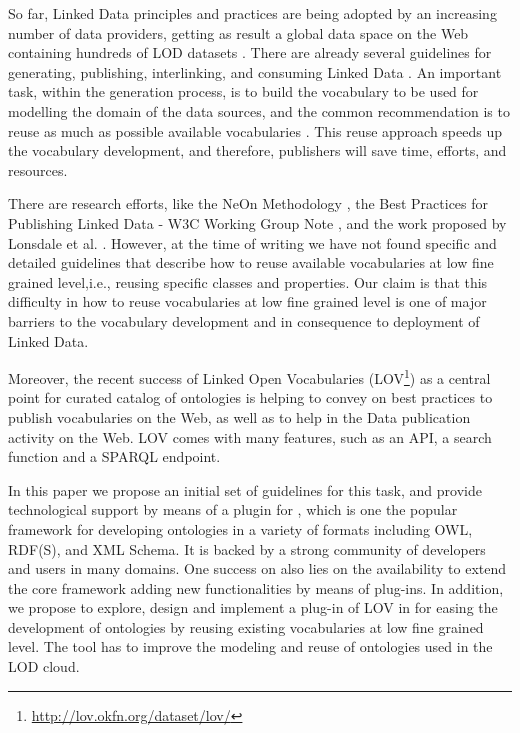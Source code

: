 So far, Linked Data principles and practices are being adopted by an increasing number of data providers, getting as result a global data space on the Web containing hundreds of LOD datasets \cite{Heath_Bizer_2011}. There are already several guidelines for generating, publishing, interlinking, and consuming Linked Data \cite{Heath_Bizer_2011}. An important task, within the generation process, is to build the vocabulary to be used for modelling the domain of the data sources, and the common recommendation is to reuse as much as possible available vocabularies \cite{Heath_Bizer_2011,hyland14}. This reuse approach speeds up the vocabulary development, and therefore, publishers will save time, efforts, and resources. 

There are research efforts, like the NeOn Methodology \cite{suarezfigueroa2012ontology}, the Best Practices for Publishing Linked Data - W3C Working Group Note \cite{hyland14}, and the work proposed by Lonsdale et al. \cite{Lonsdale2010318}. However, at the time of writing we have not found specific and detailed guidelines that describe how to reuse available vocabularies at low fine grained level,i.e., reusing specific classes and properties. Our claim is that this difficulty in how to reuse vocabularies at low fine grained level is one of major barriers to the vocabulary development and in consequence to deployment of Linked Data.

Moreover, the recent success of Linked Open Vocabularies (LOV\footnote{\url{http://lov.okfn.org/dataset/lov/}}) as a central point for curated catalog of ontologies is helping to convey on best practices to publish vocabularies on the Web, as well as to help in the Data publication activity on the Web. LOV comes with many features, such as an API, a search function and a SPARQL endpoint.

In this paper we propose an initial set of guidelines for this task, and provide technological support by means of a plugin for \protege, which is one the popular framework for developing ontologies in a variety of formats including OWL, RDF(S), and XML Schema. It is backed by a strong community of developers and users in many domains. One success on \protege also lies on the availability to extend the core framework adding new functionalities by means of plug-ins. In addition, we propose to explore, design and implement a plug-in of LOV in \protege for easing the development of ontologies by reusing existing vocabularies at low fine grained level. The tool has to improve the modeling and reuse of ontologies used in the LOD cloud.


